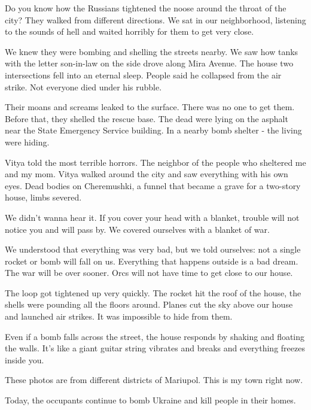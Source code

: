 Do you know how the Russians tightened the noose around the throat of the city?
They walked from different directions. We sat in our neighborhood, listening to
the sounds of hell and waited horribly for them to get very close.

We knew they were bombing and shelling the streets nearby. We saw how tanks
with the letter son-in-law on the side drove along Mira Avenue. The house two
intersections fell into an eternal sleep. People said he collapsed from the air
strike. Not everyone died under his rubble.

Their moans and screams leaked to the surface. There was no one to get them.
Before that, they shelled the rescue base. The dead were lying on the asphalt
near the State Emergency Service building. In a nearby bomb shelter - the
living were hiding.

Vitya told the most terrible horrors. The neighbor of the people who sheltered
me and my mom. Vitya walked around the city and saw everything with his own
eyes. Dead bodies on Cheremushki, a funnel that became a grave for a two-story
house, limbs severed.

We didn’t wanna hear it. If you cover your head with a blanket, trouble will
not notice you and will pass by. We covered ourselves with a blanket of war.

We understood that everything was very bad, but we told ourselves: not a single
rocket or bomb will fall on us. Everything that happens outside is a bad dream.
The war will be over sooner. Orcs will not have time to get close to our house.

The loop got tightened up very quickly. The rocket hit the roof of the house,
the shells were pounding all the floors around. Planes cut the sky above our
house and launched air strikes. It was impossible to hide from them.

Even if a bomb falls across the street, the house responds by shaking and
floating the walls. It's like a giant guitar string vibrates and breaks and
everything freezes inside you.

These photos are from different districts of Mariupol. This is my town right
now.

Today, the occupants continue to bomb Ukraine and kill people in their homes.
